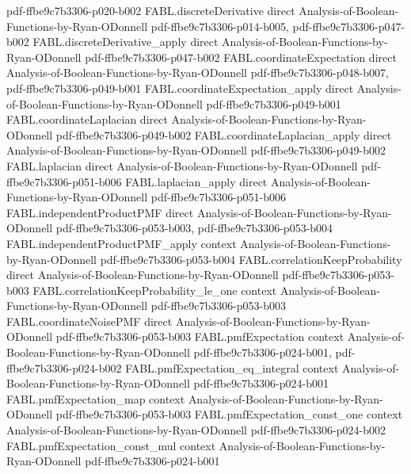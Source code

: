 \begin{theorem}
  {pdf-ffbe9c7b3306-p020-b002}
\proofstep
  {FABL.discreteDerivative}
  {direct}
  {Analysis-of-Boolean-Functions-by-Ryan-ODonnell}
  {pdf-ffbe9c7b3306-p014-b005,
    pdf-ffbe9c7b3306-p047-b002}
\proofstep
  {FABL.discreteDerivative_apply}
  {direct}
  {Analysis-of-Boolean-Functions-by-Ryan-ODonnell}
  {pdf-ffbe9c7b3306-p047-b002}
\proofstep
  {FABL.coordinateExpectation}
  {direct}
  {Analysis-of-Boolean-Functions-by-Ryan-ODonnell}
  {pdf-ffbe9c7b3306-p048-b007,
    pdf-ffbe9c7b3306-p049-b001}
\proofstep
  {FABL.coordinateExpectation_apply}
  {direct}
  {Analysis-of-Boolean-Functions-by-Ryan-ODonnell}
  {pdf-ffbe9c7b3306-p049-b001}
\proofstep
  {FABL.coordinateLaplacian}
  {direct}
  {Analysis-of-Boolean-Functions-by-Ryan-ODonnell}
  {pdf-ffbe9c7b3306-p049-b002}
\proofstep
  {FABL.coordinateLaplacian_apply}
  {direct}
  {Analysis-of-Boolean-Functions-by-Ryan-ODonnell}
  {pdf-ffbe9c7b3306-p049-b002}
\proofstep
  {FABL.laplacian}
  {direct}
  {Analysis-of-Boolean-Functions-by-Ryan-ODonnell}
  {pdf-ffbe9c7b3306-p051-b006}
\proofstep
  {FABL.laplacian_apply}
  {direct}
  {Analysis-of-Boolean-Functions-by-Ryan-ODonnell}
  {pdf-ffbe9c7b3306-p051-b006}
\proofstep
  {FABL.independentProductPMF}
  {direct}
  {Analysis-of-Boolean-Functions-by-Ryan-ODonnell}
  {pdf-ffbe9c7b3306-p053-b003,
    pdf-ffbe9c7b3306-p053-b004}
\proofstep
  {FABL.independentProductPMF_apply}
  {context}
  {Analysis-of-Boolean-Functions-by-Ryan-ODonnell}
  {pdf-ffbe9c7b3306-p053-b004}
\proofstep
  {FABL.correlationKeepProbability}
  {direct}
  {Analysis-of-Boolean-Functions-by-Ryan-ODonnell}
  {pdf-ffbe9c7b3306-p053-b003}
\proofstep
  {FABL.correlationKeepProbability_le_one}
  {context}
  {Analysis-of-Boolean-Functions-by-Ryan-ODonnell}
  {pdf-ffbe9c7b3306-p053-b003}
\proofstep
  {FABL.coordinateNoisePMF}
  {direct}
  {Analysis-of-Boolean-Functions-by-Ryan-ODonnell}
  {pdf-ffbe9c7b3306-p053-b003}
\proofstep
  {FABL.pmfExpectation}
  {context}
  {Analysis-of-Boolean-Functions-by-Ryan-ODonnell}
  {pdf-ffbe9c7b3306-p024-b001,
    pdf-ffbe9c7b3306-p024-b002}
\proofstep
  {FABL.pmfExpectation_eq_integral}
  {context}
  {Analysis-of-Boolean-Functions-by-Ryan-ODonnell}
  {pdf-ffbe9c7b3306-p024-b001}
\proofstep
  {FABL.pmfExpectation_map}
  {context}
  {Analysis-of-Boolean-Functions-by-Ryan-ODonnell}
  {pdf-ffbe9c7b3306-p053-b003}
\proofstep
  {FABL.pmfExpectation_const_one}
  {context}
  {Analysis-of-Boolean-Functions-by-Ryan-ODonnell}
  {pdf-ffbe9c7b3306-p024-b002}
\proofstep
  {FABL.pmfExpectation_const_mul}
  {context}
  {Analysis-of-Boolean-Functions-by-Ryan-ODonnell}
  {pdf-ffbe9c7b3306-p024-b001}

\end{theorem}
